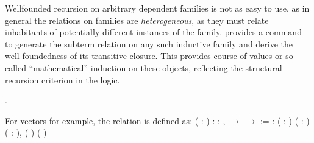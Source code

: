   Wellfounded recursion on arbitrary dependent families is not as easy
  to use, as in general the relations on families are \textit{heterogeneous},
  as they must relate inhabitants of potentially different instances of
  the family.   provides a  command to generate the
  subterm relation on any such inductive family and derive the
  well-foundedness of its transitive closure. This provides
  course-of-values or so-called ``mathematical'' induction on these
  objects, reflecting the structural recursion criterion in the logic. \begin{coqdoccode}
\coqdocemptyline
\coqdocnoindent
{}   .\coqdoceol
\coqdocemptyline
\end{coqdoccode}
For vectors for example, the relation is defined as: \coqdoceol
\coqdocemptyline
\coqdocnoindent
{}  ( : ) :\coqdoceol
\coqdocindent{1.00em}
\coqdockw{\ensuremath{\forall}}   : ,    \ensuremath{\rightarrow}    \ensuremath{\rightarrow}  :=\coqdoceol
\coqdocindent{2.00em}
 : \coqdockw{\ensuremath{\forall}} ( : ) ( : ) ( :   ),\coqdoceol
\coqdocindent{3.00em}
   ( )  (  ) 

\coqdocemptyline


